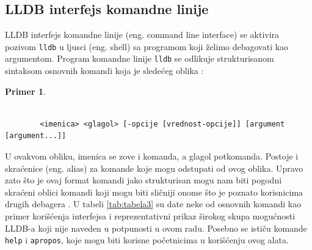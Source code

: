 \documentclass[a4paper]{article}
\newtheorem{primer}{Primer}[section]
\begin{document}
\subsection{LLDB interfejs komandne linije}
LLDB interfejs komandne linije (eng. command line interface) se aktivira pozivom
\verb|lldb| u ljusci (eng. shell) sa programom koji želimo debagovati kao
argumentom. Program komandne linije \verb|lldb| se odlikuje strukturisanom sintaksom
osnovnih komandi koja je sledećeg oblika \cite{lldb_tutorial}:
\begin{primer}
	\begin{footnotesize}
		\begin{verbatim}
		
		<imenica> <glagol> [-opcije [vrednost-opcije]] [argument [argument...]]
		\end{verbatim}
	\end{footnotesize}
\end{primer}
U ovakvom obliku, imenica se zove i komanda, a glagol potkomanda. Postoje i
skraćenice (eng. alias) za komande koje mogu odstupati od ovog oblika. Upravo
zato što je ovaj format komandi jako strukturisan mogu nam biti pogodni skraćeni
oblici komandi koji mogu biti sličniji onome što je poznato korisnicima drugih
debagera \cite{apple_lldb_comms}. U tabeli \ref{tab:tabela3} su date neke od
osnovnih komandi kao primer korišćenja interfejsa i reprezentativni prikaz
širokog skupa mogućnosti LLDB-a koji nije naveden u potpunosti u ovom
radu. Posebno se ističu komande \verb|help| i \verb|apropos|, koje mogu biti
korisne početnicima u korišćenju ovog alata.
\end{document}
